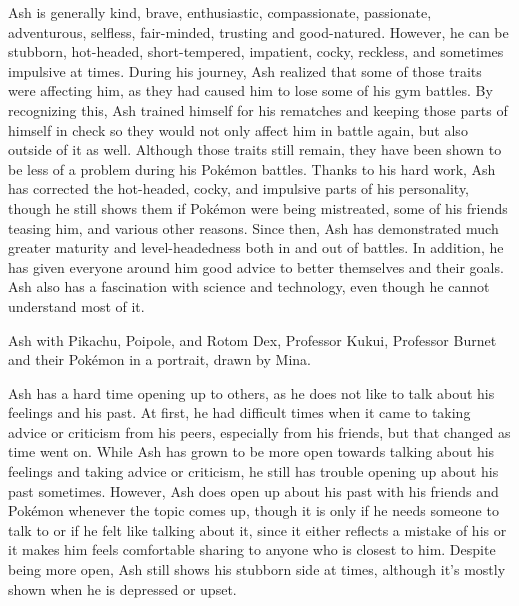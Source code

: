 \documentclass[a4paper,12pt]{article}
\begin{document}
Ash is generally kind, brave, enthusiastic, compassionate, passionate, adventurous, selfless, fair-minded, trusting and good-natured. However, he can be stubborn, hot-headed, short-tempered, impatient, cocky, reckless, and sometimes impulsive at times. During his journey, Ash realized that some of those traits were affecting him, as they had caused him to lose some of his gym battles. By recognizing this, Ash trained himself for his rematches and keeping those parts of himself in check so they would not only affect him in battle again, but also outside of it as well. Although those traits still remain, they have been shown to be less of a problem during his Pokémon battles. Thanks to his hard work, Ash has corrected the hot-headed, cocky, and impulsive parts of his personality, though he still shows them if Pokémon were being mistreated, some of his friends teasing him, and various other reasons. Since then, Ash has demonstrated much greater maturity and level-headedness both in and out of battles. In addition, he has given everyone around him good advice to better themselves and their goals. Ash also has a fascination with science and technology, even though he cannot understand most of it.\\ \par \vspace{0.5cm}

Ash with Pikachu, Poipole, and Rotom Dex, Professor Kukui, Professor Burnet and their Pokémon in a portrait, drawn by Mina.\\ \par \vspace{0.5cm}

Ash has a hard time opening up to others, as he does not like to talk about his feelings and his past. At first, he had difficult times when it came to taking advice or criticism from his peers, especially from his friends, but that changed as time went on. While Ash has grown to be more open towards talking about his feelings and taking advice or criticism, he still has trouble opening up about his past sometimes. However, Ash does open up about his past with his friends and Pokémon whenever the topic comes up, though it is only if he needs someone to talk to or if he felt like talking about it, since it either reflects a mistake of his or it makes him feels comfortable sharing to anyone who is closest to him. Despite being more open, Ash still shows his stubborn side at times, although it's mostly shown when he is depressed or upset.\\ \par \vspace{0.5cm}
\end{document}
